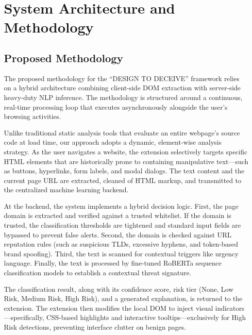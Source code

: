 \documentclass[12pt,a4paper]{report}
\begin{document}
\chapter{System Architecture and Methodology}

\section{Proposed Methodology}
The proposed methodology for the ``DESIGN TO DECEIVE'' framework relies on a hybrid architecture combining client-side DOM extraction with server-side heavy-duty NLP inference. The methodology is structured around a continuous, real-time processing loop that executes asynchronously alongside the user's browsing activities.

Unlike traditional static analysis tools that evaluate an entire webpage's source code at load time, our approach adopts a dynamic, element-wise analysis strategy. As the user navigates a website, the extension selectively targets specific HTML elements that are historically prone to containing manipulative text—such as buttons, hyperlinks, form labels, and modal dialogs. The text content and the current page URL are extracted, cleaned of HTML markup, and transmitted to the centralized machine learning backend.

At the backend, the system implements a hybrid decision logic. First, the page domain is extracted and verified against a trusted whitelist. If the domain is trusted, the classification thresholds are tightened and standard input fields are bypassed to prevent false alerts. Second, the domain is checked against URL reputation rules (such as suspicious TLDs, excessive hyphens, and token-based brand spoofing). Third, the text is scanned for contextual triggers like urgency language. Finally, the text is processed by fine-tuned RoBERTa sequence classification models to establish a contextual threat signature.

The classification result, along with its confidence score, risk tier (None, Low Risk, Medium Risk, High Risk), and a generated explanation, is returned to the extension. The extension then modifies the local DOM to inject visual indicators—specifically, CSS-based highlights and interactive tooltips—exclusively for High Risk detections, preventing interface clutter on benign pages.
\end{document}
